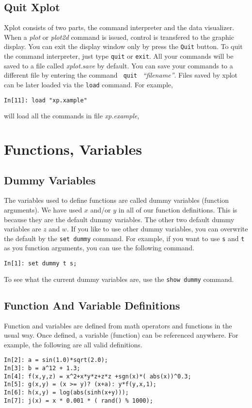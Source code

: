 \subsection{Quit Xplot}
Xplot consists of two parts,
the command interpreter and the
data visualizer. When a {\it plot} 
or {\it plot2d} command is
issued, control is transfered to the graphic display.
You can exit the display window only by press 
the \verb+Quit+ button.
To quit the command interpreter, just type \verb+quit+ or
\verb+exit+. All your commands will be saved to a file
called {\it xplot.save} by default. You can save your commands
to a different file by entering the command \verb+ quit +
{\it ``filename''}. Files saved by xplot can be later loaded via the
\verb+load+ command. For example, 
\begin{verbatim}
In[11]: load "xp.xample"
\end{verbatim}
will load all the commands in file {\it xp.example},


\section{Functions, Variables}

\subsection{Dummy Variables}
The variables used to define functions are called
dummy variables (function arguments).
We have used $x$ and/or $y$ in all of
our function definitions. This is because 
they are the default dummy variables. The other two default
dummy variables are $z$ and $w$. If you like to
use other dummy variables, you can overwrite the default
by the \verb+set dummy+ command. For example, if you
want to use \verb+s+ and \verb+t+ as you function
arguments, you can use the following command.
\begin{verbatim}
In[1]: set dummy t s;
\end{verbatim}
To see what the current dummy variables are, use
the \verb+show dummy+ command.

\subsection{Function And Variable Definitions}
Function and variables are defined from math operators
and functions in the usual way. Once defined, a variable
(function) can be referenced anywhere.
For example, 
the following are all valid definitions.
\begin{verbatim}
In[2]: a = sin(1.0)*sqrt(2.0);
In[3]: b = a^12 + 1.3;
In[4]: f(x,y,z) = x^2+x*y*z+z*z +sgn(x)*( abs(x))^0.3;
In[5]: g(x,y) = (x >= y)? (x+a): y*f(y,x,1);
In[6]: h(x,y) = log(abs(sinh(x+y)));
In[7]: j(x) = x * 0.001 * ( rand() % 1000);
\end{verbatim}

